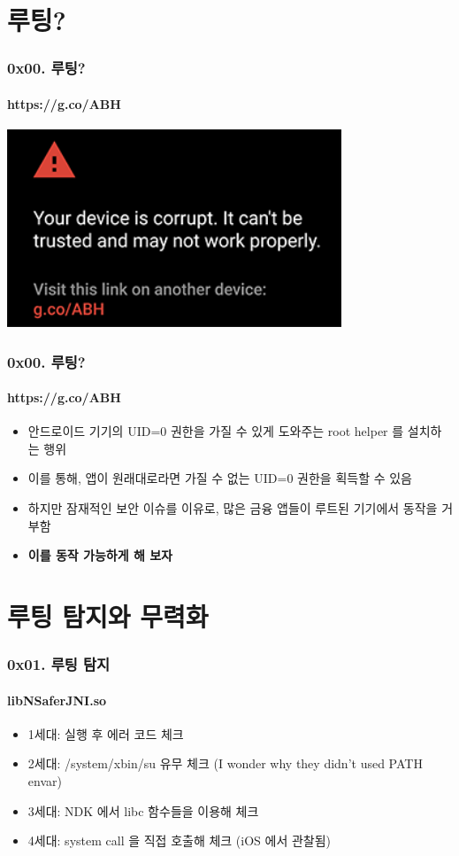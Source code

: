 
\begin{frame}
  \titlepage
\end{frame}

\usebackgroundtemplate{}

\section[Section]{루팅?}
\begin{frame}
  \frametitle{0x00. 루팅?}
  \framesubtitle{https://g.co/ABH}

  \begin{center}
    \includegraphics [width=100mm]{img/corrupted_nexus.png}
  \end{center}
\end{frame}

\begin{frame}
  \frametitle{0x00. 루팅?}
  \framesubtitle{https://g.co/ABH}

  \begin{itemize}
  \item 안드로이드 기기의 UID=0 권한을 가질 수 있게 도와주는 root helper 를 설치하는 행위
  \item<2-> 이를 통해, 앱이 원래대로라면 가질 수 없는 UID=0 권한을 획득할 수 있음
  \item<3-> 하지만 잠재적인 보안 이슈를 이유로, 많은 금융 앱들이 루트된 기기에서 동작을 거부함
  \item<4-> \textbf{이를 동작 가능하게 해 보자}
  \end{itemize}
\end{frame}
 
\section[Section]{루팅 탐지와 무력화}
\begin{frame}
  \frametitle{0x01. 루팅 탐지}
  \framesubtitle{libNSaferJNI.so}

  \begin{itemize}
  \item 1세대: 실행 후 에러 코드 체크
  \item <2-> 2세대: /system/xbin/su 유무 체크 (I wonder why they didn't used PATH envar)
  \item <3-> 3세대: NDK 에서 libc 함수들을 이용해 체크
  \item <4-> 4세대: system call 을 직접 호출해 체크 (iOS 에서 관찰됨)
  \end{itemize}
\end{frame}

